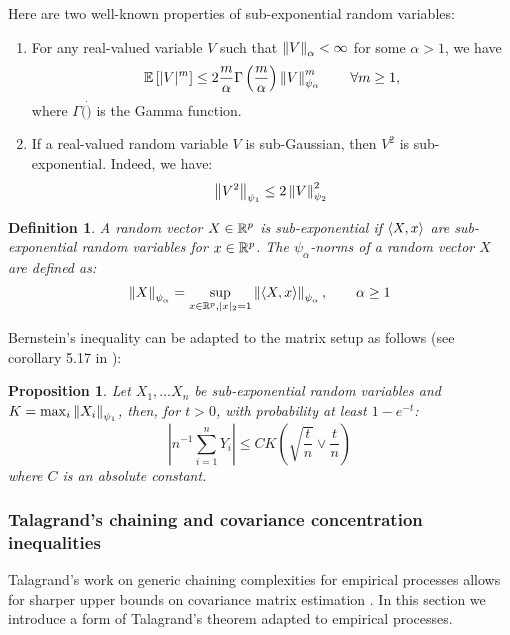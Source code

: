 \documentclass{article}
\numberwithin{equation}{section}
\newtheorem{definition}{Definition}
\newtheorem{proposition}{Proposition}
\numberwithin{equation}{section}
\begin{document}
        Here are two well-known properties of sub-exponential random variables:
        \begin{enumerate}
            \item For any real-valued variable $V$ such that $\left\Vert V \right\Vert_\alpha < \infty$ for some $\alpha > 1$, we have \[\mathbb{E}\left[ \vert V\vert^m\right] \leq 2 \frac{m}{\alpha}\Gamma\left( \frac{m}{\alpha}\right) \left\Vert V \right\Vert_{\psi_{\alpha}}^m \qquad \forall m \geq 1,\]
            where $\Gamma( \dot )$ is the Gamma function.
            \item If a real-valued random variable $V$ is sub-Gaussian, then $V^2$ is sub-exponential. Indeed, we have: \[\left\Vert V^2 \right\Vert_{\psi_{1}} \leq 2 \left\Vert V \right\Vert_{\psi_{2}}^2\]
        \end{enumerate}
    
        \begin{definition}
            A random vector $X \in \mathbb{R}^p$ is sub-exponential if $\langle X , x \rangle$ are sub-exponential random variables for $x\in \mathbb{R}^p$. The $\psi_\alpha$-norms of a random vector $X$ are defined as:
            \[\left\Vert X \right\Vert_{\psi_{\alpha}} = \sup_{x\in\mathbb{R}^p, \vert x \vert_2 = 1} \left\Vert \langle X , x \rangle \right\Vert_{\psi_{\alpha}}, \qquad \alpha \geq 1\]
        \end{definition}
        
        Bernstein's inequality can be adapted to the matrix setup as follows (see corollary 5.17 in \cite{vershyninIntroductionNonasymptoticAnalysis2011}):
        \begin{proposition}
            \label{th:bernstein}
            Let $X_1, \dots X_n$ be sub-exponential random variables and $K = \max_i \left\Vert X_i \right\Vert_{\psi_{1}}$, then, for $t>0$, with probability at least $1-e^{-t}$:
            \begin{equation}
                \left\vert n^{-1}\sum_{i=1}^n Y_i \right\vert \leq CK\left(\sqrt{\frac{t}{n}}\lor \frac{t}{n} \right)
            \end{equation}
            where $C$ is an absolute constant.
        \end{proposition}

    \subsubsection{Talagrand's chaining and covariance concentration inequalities}

        Talagrand's work on generic chaining complexities for empirical processes allows for sharper upper bounds on covariance matrix estimation \citep{koltchinskiiConcentrationInequalitiesMoment2014}. In this section we introduce a form of Talagrand's theorem adapted to empirical processes.
\end{document}
